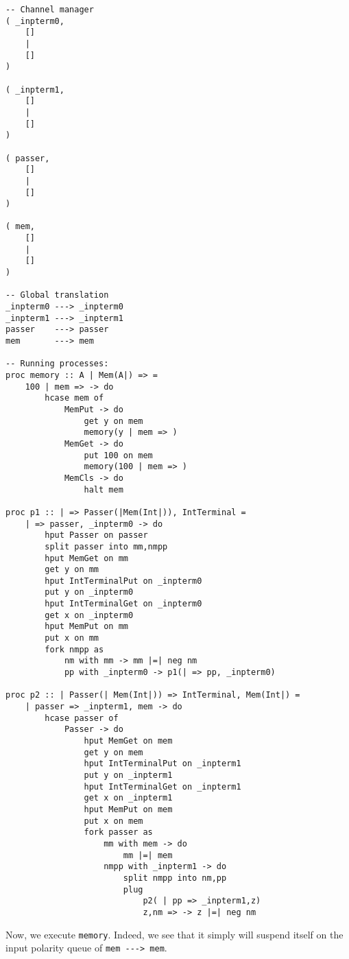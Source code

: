 \documentclass{article}
\theoremstyle{plain}%
\theoremstyle{definition}
\theoremstyle{remark}
\begin{document}
\begin{verbatim}
-- Channel manager
( _inpterm0,  
    []
    |
    []
)

( _inpterm1,  
    []
    |
    []
)

( passer,
    []
    |
    []
)

( mem,
    []
    |
    []
)

-- Global translation
_inpterm0 ---> _inpterm0 
_inpterm1 ---> _inpterm1 
passer    ---> passer 
mem       ---> mem

-- Running processes:
proc memory :: A | Mem(A|) => =
    100 | mem => -> do
        hcase mem of
            MemPut -> do
                get y on mem
                memory(y | mem => )
            MemGet -> do
                put 100 on mem
                memory(100 | mem => )
            MemCls -> do
                halt mem

proc p1 :: | => Passer(|Mem(Int|)), IntTerminal = 
    | => passer, _inpterm0 -> do
        hput Passer on passer
        split passer into mm,nmpp
        hput MemGet on mm 
        get y on mm
        hput IntTerminalPut on _inpterm0
        put y on _inpterm0
        hput IntTerminalGet on _inpterm0
        get x on _inpterm0
        hput MemPut on mm
        put x on mm
        fork nmpp as
            nm with mm -> mm |=| neg nm 
            pp with _inpterm0 -> p1(| => pp, _inpterm0)

proc p2 :: | Passer(| Mem(Int|)) => IntTerminal, Mem(Int|) =
    | passer => _inpterm1, mem -> do
        hcase passer of
            Passer -> do
                hput MemGet on mem
                get y on mem
                hput IntTerminalPut on _inpterm1
                put y on _inpterm1
                hput IntTerminalGet on _inpterm1
                get x on _inpterm1
                hput MemPut on mem
                put x on mem
                fork passer as
                    mm with mem -> do
                        mm |=| mem
                    nmpp with _inpterm1 -> do
                        split nmpp into nm,pp
                        plug
                            p2( | pp => _inpterm1,z)
                            z,nm => -> z |=| neg nm

\end{verbatim}
Now, we execute \verb|memory|. Indeed, we see that it simply will suspend itself on the input polarity queue of \verb|mem ---> mem|.
\end{document}
